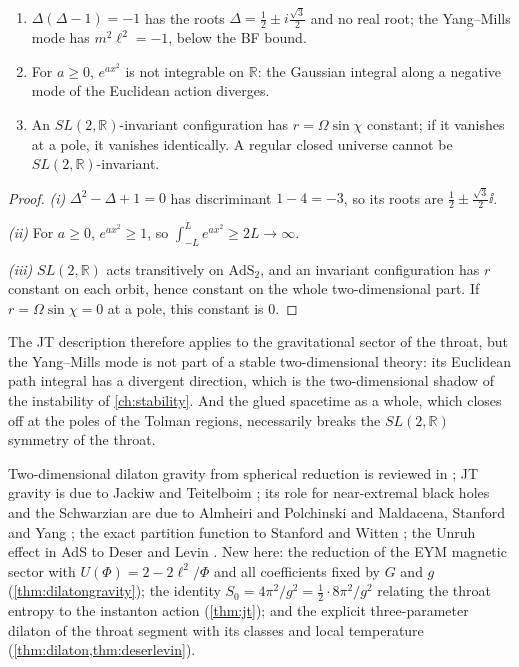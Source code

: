 \begin{proposition}\label{prop:jtmode}\ver\
\begin{enumerate}[label=(\roman*)]
\item $\Delta(\Delta-1)=-1$ has the roots $\Delta=\frac12\pm i\frac{\sqrt3}2$ and no real root; the Yang--Mills mode has $m^2\ell^2=-1$, below the BF bound.
\item For $a\ge0$, $e^{ax^2}$ is not integrable on $\mathbb R$: the Gaussian integral along a negative mode of the Euclidean action diverges.
\item An $SL(2,\mathbb R)$-invariant configuration has $r=\Omega\sin\chi$ constant; if it vanishes at a pole, it vanishes identically. A regular closed universe cannot be $SL(2,\mathbb R)$-invariant.
\end{enumerate}
\end{proposition}
\begin{proof}
\emph{(i)} $\Delta^2-\Delta+1=0$ has discriminant $1-4=-3$, so its roots are $\frac12\pm\frac{\sqrt3}2\ii$.

\emph{(ii)} For $a\ge0$, $e^{ax^2}\ge1$, so $\int_{-L}^Le^{ax^2}\ge2L\to\infty$.

\emph{(iii)} $SL(2,\mathbb R)$ acts transitively on $\mathrm{AdS}_2$, and an invariant configuration has $r$ constant on each orbit, hence constant on the whole two-dimensional part. If $r=\Omega\sin\chi=0$ at a pole, this constant is $0$.
\end{proof}


The JT description therefore applies to the gravitational sector of the throat, but the Yang--Mills mode is not part of a stable two-dimensional theory: its Euclidean path integral has a divergent direction, which is the two-dimensional shadow of the instability of \cref{ch:stability}. And the glued spacetime as a whole, which closes off at the poles of the Tolman regions, necessarily breaks the $SL(2,\mathbb R)$ symmetry of the throat.

\begin{litbox}
Two-dimensional dilaton gravity from spherical reduction is reviewed in \cite{GrumillerKummerVassilevich2002}; JT gravity is due to Jackiw and Teitelboim \cite{Jackiw1985,Teitelboim1983}; its role for near-extremal black holes and the Schwarzian are due to Almheiri and Polchinski \cite{AlmheiriPolchinski2015} and Maldacena, Stanford and Yang \cite{MaldacenaStanfordYang2016}; the exact partition function to Stanford and Witten \cite{StanfordWitten2017}; the Unruh effect in AdS to Deser and Levin \cite{DeserLevin1997}. New here: the reduction of the EYM magnetic sector with $U(\Phi)=2-2\ell^2/\Phi$ and all coefficients fixed by $G$ and $g$ (\cref{thm:dilatongravity}); the identity $S_0=4\pi^2/g^2=\frac12\cdot8\pi^2/g^2$ relating the throat entropy to the instanton action (\cref{thm:jt}); and the explicit three-parameter dilaton of the throat segment with its classes and local temperature (\cref{thm:dilaton,thm:deserlevin}).
\end{litbox}

